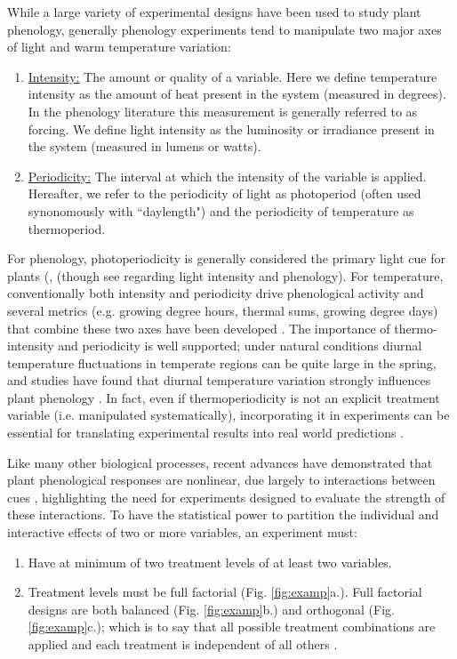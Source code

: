 \documentclass[11pt]{article}
\begin{document}
While a large variety of experimental designs have been used to study plant phenology, generally phenology experiments tend to manipulate two major axes of light and warm temperature variation:
\begin{enumerate}
\item \underline{Intensity:} The amount or quality of a variable. Here we define temperature intensity as the amount of heat present in the system (measured in degrees). In the phenology literature this measurement is generally referred to as forcing. We define light intensity as the luminosity or irradiance present in the system (measured in lumens or watts). 
\item \underline{Periodicity:} The interval at which the intensity of the variable is applied. Hereafter, we refer to the periodicity of light as photoperiod (often used synonomously with ``daylength") and the periodicity of temperature as thermoperiod. 
\end{enumerate}
For phenology, photoperiodicity is generally considered the primary light cue for plants (\citep{WAY:2015aa}, (though see \cite{Brelsford2018,Cober1996} regarding light intensity and phenology). For temperature, conventionally both intensity and periodicity drive phenological activity and several metrics (e.g. growing degree hours, thermal sums, growing degree days)  that combine these two axes have been developed \citep{Gu:2016wa}. The importance of thermo-intensity and periodicity is well supported; under natural conditions diurnal temperature fluctuations in temperate regions can be quite large in the spring, and studies have found that diurnal temperature variation strongly influences plant phenology \citep{Burghardt:2016uy}. In fact, even if thermoperiodicity is not an explicit treatment variable (i.e. manipulated systematically), incorporating it in experiments can be essential for translating experimental results into real world predictions \citep{plants9101312}.

Like many other biological processes, recent advances have demonstrated that plant phenological responses are nonlinear, due largely to interactions between cues \citep{limitingcues,fu2015}, highlighting the need for experiments designed to evaluate the strength of these interactions. To have the statistical power to partition the individual and interactive effects of two or more variables, an experiment must:
\begin{enumerate}
\item Have at minimum of two treatment levels of at least two variables.
\item Treatment levels must be full factorial (Fig. \ref{fig:examp}a.). Full factorial designs are both balanced (Fig. \ref{fig:examp}b.)  and orthogonal (Fig. \ref{fig:examp}c.); which is to say that all possible treatment combinations are applied and each treatment is independent of all others \citep{cheng2016}.
\end{enumerate}
\end{document}
